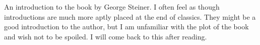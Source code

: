 An introduction to the book by George Steiner. I often feel as though
introductions are much more aptly placed at the end of classics. They might be
a good introduction to the author, but I am unfamiliar with the plot of the
book and wish not to be spoiled. I will come back to this after reading.
